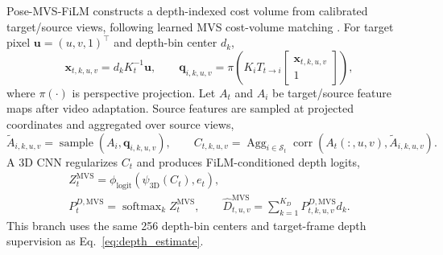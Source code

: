 Pose-MVS-FiLM constructs a depth-indexed cost volume from calibrated target/source views, following learned MVS cost-volume matching \cite{yao2018mvsnet}. For target pixel $\mathbf{u}=(u,v,1)^\top$ and depth-bin center $d_k$,
\begin{equation}
    \mathbf{x}_{t,k,u,v}=d_k K_t^{-1}\mathbf{u},
    \qquad
    \mathbf{q}_{i,k,u,v}=\pi\!\left(K_i T_{t\rightarrow i}
    \begin{bmatrix}\mathbf{x}_{t,k,u,v}\\1\end{bmatrix}\right),
    \label{eq:mvs_projection}
\end{equation}
where $\pi(\cdot)$ is perspective projection. Let $A_t$ and $A_i$ be target/source feature maps after video adaptation. Source features are sampled at projected coordinates and aggregated over source views,
\begin{equation}
    \widetilde{A}_{i,k,u,v}=\operatorname{sample}\left(A_i,\mathbf{q}_{i,k,u,v}\right),
    \qquad
    C_{t,k,u,v}=\operatorname{Agg}_{i\in\mathcal{S}_t}
    \operatorname{corr}\left(A_t(:,u,v),\widetilde{A}_{i,k,u,v}\right).
    \label{eq:mvs_cost_volume}
\end{equation}
A 3D CNN regularizes $C_t$ and produces FiLM-conditioned depth logits,
\begin{equation}
    \begin{gathered}
    Z_{t}^{\mathrm{MVS}}=\phi_{\mathrm{logit}}\!\left(\psi_{3\mathrm{D}}(C_t),e_t\right),\\
    P_{t}^{D,\mathrm{MVS}}=\operatorname{softmax}_k Z_t^{\mathrm{MVS}},
    \qquad
    \hat{D}_{t,u,v}^{\mathrm{MVS}}=\sum_{k=1}^{K_D}P_{t,k,u,v}^{D,\mathrm{MVS}}d_k .
    \end{gathered}
    \label{eq:mvs_depth_estimate}
\end{equation}
This branch uses the same 256 depth-bin centers and target-frame depth supervision as Eq.~\eqref{eq:depth_estimate}.

